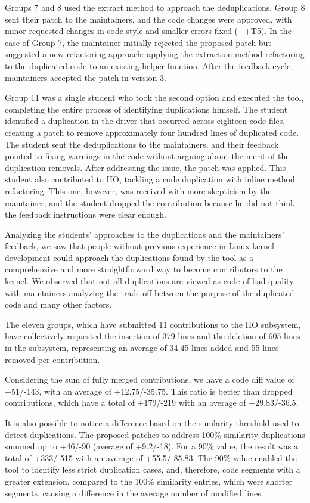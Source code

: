 \documentclass[10pt,conference]{IEEEtran}
\begin{document}
Groups 7 and 8 used the extract method to approach the deduplications. Group 8 sent their patch to the maintainers, and the code changes were approved, with minor requested changes in code style and smaller errors fixed (++T5). In the case of Group 7, the maintainer initially rejected the proposed patch but suggested a new refactoring approach: applying the extraction method refactoring to the duplicated code to an existing helper function. After the feedback cycle, maintainers accepted the patch in version 3.


Group 11 was a single student who took the second option and executed the tool, completing the entire process of identifying duplications himself. The student identified a duplication in the driver that occurred across eighteen code files, creating a patch to remove approximately four hundred lines of duplicated code. The student sent the deduplications to the maintainers, and their feedback pointed to fixing warnings in the code without arguing about the merit of the duplication removals. After addressing the issue, the patch was applied. This student also contributed to IIO, tackling a code duplication with inline method refactoring. This one, however, was received with more skepticism by the maintainer, and the student dropped the contribution because he did not think the feedback instructions were clear enough.

Analyzing the students' approaches to the duplications and the maintainers' feedback, we saw that people without previous experience in Linux kernel development could approach the duplications found by the tool as a comprehensive and more straightforward way to become contributors to the kernel. We observed that not all duplications are viewed as code of bad quality, with maintainers analyzing the trade-off between the purpose of the duplicated code and many other factors.

The eleven groups, which have submitted 11 contributions to the IIO subsystem, have collectively requested the insertion of 379 lines and the deletion of 605 lines in the subsystem, representing an average of 34.45 lines added and 55 lines removed per contribution.

Considering the sum of fully merged contributions, we have a code diff value of +51/-143, with an average of +12.75/-35.75. This ratio is better than dropped contributions, which have a total of +179/-219 with an average of +29.83/-36.5.

It is also possible to notice a difference based on the similarity threshold used to detect duplications. The proposed patches to address 100\%-similarity duplications summed up to +46/-90 (average of +9.2/-18). For a 90\% value, the result was a total of +333/-515 with an average of +55.5/-85.83. The 90\% value enabled the tool to identify less strict duplication cases, and, therefore, code segments with a greater extension, compared to the 100\% similarity entries, which were shorter segments, causing a difference in the average number of modified lines.
\end{document}
